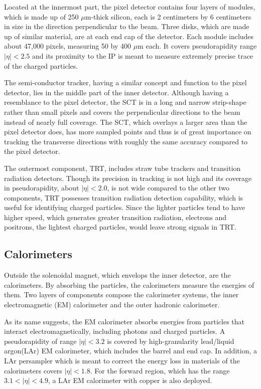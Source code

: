 \documentclass[class=NCU_thesis, crop=false]{standalone}
\begin{document}
		Located at the innermost part, the pixel detector contains four layers of modules, which is made up of 250 $\mu$m-thick silicon, each is 2 centimeters by 6 centimeters in size in the direction perpendicular to the beam. Three disks, which are made up of similar material, are at each end cap of the detector. Each module includes about 47,000 pixels, measuring 50 by 400 $\mu$m each. It covers pseudorapidity range $\lvert \eta \rvert < 2.5$ and its proximity to the IP is meant to measure extremely precise trace of the charged particles.
		
		The semi-conductor tracker, having a similar concept and function to the pixel detector, lies in the middle part of the inner detector. Although having a resemblance to the pixel detector, the SCT is in a long and narrow strip-shape rather than small pixels and covers the perpendicular directions to the beam instead of nearly full coverage. The SCT, which overlays a larger area than the pixel detector does, has more sampled points and thus is of great importance on tracking the transverse directions with roughly the same accuracy compared to the pixel detector.
		
		The outermost component, TRT, includes straw tube trackers and transition radiation detectors. Though its precision in tracking is not high and its coverage in pseudorapidity, about $\rvert \eta \lvert < 2.0$, is not wide compared to the other two components, TRT possesses transition radiation detection capability, which is useful for identifying charged particles. Since the lighter particles tend to have higher speed, which generates greater transition radiation, electrons and positrons, the lightest charged particles, would leave strong signals in TRT.
	
	\subsection{Calorimeters}
		Outside the solenoidal magnet, which envelops the inner detector, are the calorimeters. By absorbing the particles, the calorimeters measure the energies of them. Two layers of components compose the calorimeter systems, the inner electromagnetic (EM) calorimeter and the outer hadronic calorimeter.
		
		As its name suggests, the EM calorimeter absorbs energies from particles that interact electromagnetically, including photons and charged particles. A pseudorapidity of range $\lvert \eta \rvert < 3.2$ is covered by high-granularity lead/liquid argon(LAr) EM calorimeter, which includes the barrel and end cap. In addition, a LAr persampler which is meant to correct the energy loss in materials of the calorimeters covers $\lvert \eta \rvert < 1.8$. For the forward region, which has the range $3.1 < \lvert \eta \rvert < 4.9$, a LAr EM calorimeter with copper is also deployed.
		
\end{document}
